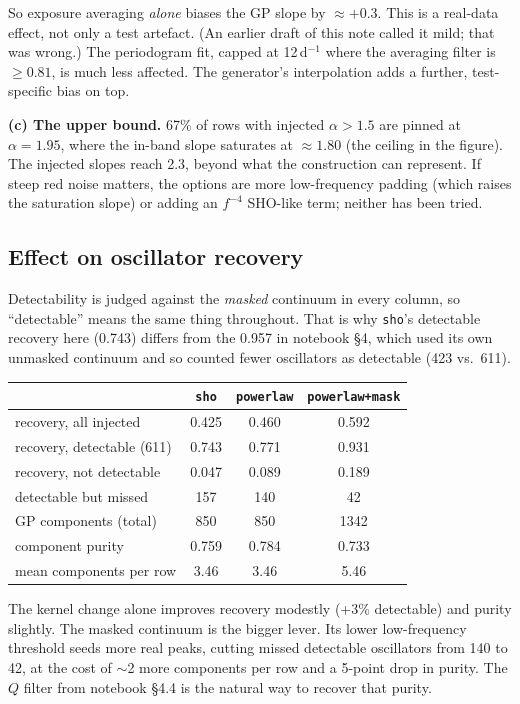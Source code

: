 \documentclass[11pt]{article}
\newcommand{\code}[1]{\texttt{#1}}
\begin{document}
So exposure averaging \emph{alone} biases the GP slope by $\approx+0.3$. This is a
real-data effect, not only a test artefact. (An earlier draft of this note called it
mild; that was wrong.) The periodogram fit, capped at 12\,d$^{-1}$ where the averaging
filter is $\geq 0.81$, is much less affected. The generator's interpolation adds a
further, test-specific bias on top.

\textbf{(c) The upper bound.} 67\% of rows with injected $\alpha>1.5$ are pinned at
$\alpha = 1.95$, where the in-band slope saturates at $\approx1.80$ (the ceiling in
the figure). The injected slopes reach 2.3, beyond what the construction can represent.
If steep red noise matters, the options are more low-frequency padding (which raises the
saturation slope) or adding an $f^{-4}$ SHO-like term; neither has been tried.

\subsection{Effect on oscillator recovery}

Detectability is judged against the \emph{masked} continuum in every column, so
``detectable'' means the same thing throughout. That is why \code{sho}'s detectable
recovery here (0.743) differs from the 0.957 in notebook \S4, which used its own unmasked
continuum and so counted fewer oscillators as detectable (423 vs.\ 611).

\begin{center}
\begin{tabular}{lccc}
\toprule
 & \code{sho} & \code{powerlaw} & \code{powerlaw+mask} \\
\midrule
recovery, all injected            & 0.425 & 0.460 & 0.592 \\
recovery, detectable (611)        & 0.743 & 0.771 & 0.931 \\
recovery, not detectable          & 0.047 & 0.089 & 0.189 \\
detectable but missed             & 157   & 140   & 42 \\
GP components (total)             & 850   & 850   & 1342 \\
component purity                  & 0.759 & 0.784 & 0.733 \\
mean components per row           & 3.46  & 3.46  & 5.46 \\
\bottomrule
\end{tabular}
\end{center}

The kernel change alone improves recovery modestly (+3\% detectable) and purity
slightly. The masked continuum is the bigger lever. Its lower low-frequency threshold
seeds more real peaks, cutting missed detectable oscillators from 140 to 42, at the cost
of $\sim$2 more components per row and a 5-point drop in purity. The $Q$ filter from
notebook \S4.4 is the natural way to recover that purity.
\end{document}

